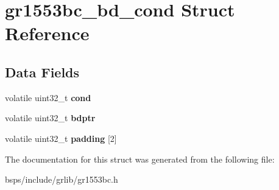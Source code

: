 \hypertarget{structgr1553bc__bd__cond}{}\section{gr1553bc\+\_\+bd\+\_\+cond Struct Reference}
\label{structgr1553bc__bd__cond}
\subsection*{Data Fields}
\begin{DoxyCompactItemize}
\item 
\mbox{\label{structgr1553bc__bd__cond_aa7bca358da683b0ffbbcb5fc9574d378}} 
volatile uint32\+\_\+t {\bfseries cond}
\item 
\mbox{\label{structgr1553bc__bd__cond_a84452b2a4e0b6b0f1244a6fb6950a7d4}} 
volatile uint32\+\_\+t {\bfseries bdptr}
\item 
\mbox{\label{structgr1553bc__bd__cond_a397f753b9cf97d2007031e07d1e3863f}} 
volatile uint32\+\_\+t {\bfseries padding} \mbox{[}2\mbox{]}
\end{DoxyCompactItemize}


The documentation for this struct was generated from the following file\+:\begin{DoxyCompactItemize}
\item 
bsps/include/grlib/gr1553bc.\+h\end{DoxyCompactItemize}

